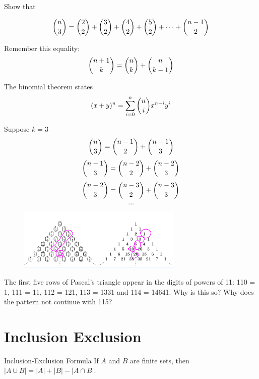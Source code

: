 \documentclass[openany, 12pt]{book}
\begin{document}
\begin{exercise}{}{}
	Show that
	\begin{alist}
		\item
		$$
			\dbinom{n}{3}=
			\dbinom{2}{2} +
			\dbinom{3}{2} +
			\dbinom{4}{2} +
			\dbinom{5}{2} +
			\dots +
			\dbinom{n-1}{2}
		$$

		\item Remember this equality:
		$$\dbinom{n+1}{k} = \dbinom{n}{k} + \dbinom{n}{k-1}$$

		\item The binomial theorem states
		$$(x+y)^n=\sum\limits_{i=0}^n\dbinom{n}{i}x^{n-i}y^i$$
		\item

		\item Suppose $k=3$
		$$
			\dbinom{n}{3}=
			\dbinom{n-1}{2} +
			\dbinom{n-1}{3}
		$$
		$$
			\dbinom{n-1}{3} =
			\dbinom{n-2}{2} +
			\dbinom{n-2}{3}
		$$
		$$
			\dbinom{n-2}{3} =
			\dbinom{n-3}{2} +
			\dbinom{n-3}{3}
		$$
		$$
			\dots
		$$
	\end{alist}
\end{exercise}
\begin{figure}
	\centering
	\includegraphics[width=0.7\textwidth]{images/pascals-triangle.png}
\end{figure}
\begin{exercise}{}{}
	The first five rows of Pascal's triangle appear in the digits of powers of 11: 110 = 1,
	111 = 11, 112 = 121, 113 = 1331 and 114 = 14641. Why is this so? Why does the
	pattern not continue with 115?
\end{exercise}

\section{Inclusion Exclusion}

\begin{definition}{Inclusion-Exclusion Formula}{}
	If $A$ and $B$ are finite sets, then $|A \cup B|=|A|+|B|-|A \cap B|$.
\end{definition}
\end{document}
